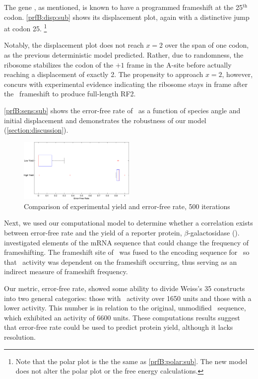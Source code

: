\documentclass[12pt]{article}
\begin{document}
The gene \prfB, as mentioned, is known
to have a programmed frameshift at the 25$^{\textrm{th}}$ codon.
\autoref{prfB:disp:sub} shows its displacement plot,
again with a distinctive jump at codon 25.
\footnote{Note that the polar plot is the the same as \autoref{prfB:polar:sub}.
The new model does not alter the polar plot or the free energy calculations.}

Notably, the displacement plot does not reach $x=2$ over the span of
one codon, as the previous deterministic model predicted.  Rather, due to randomness, the
ribosome stabilizes the codon of the $+1$ frame in the A-site before actually reaching
a displacement of exactly 2.  The propensity to approach $x=2$,
however, concurs with experimental evidence indicating the ribosome
stays in frame after the \prfB\ frameshift to produce full-length RF2.
  
\autoref{prfB:sens:sub} shows the error-free rate of \prfB\ as a function
of species angle and initial displacement and demonstrates the
robustness of our model (\autoref{section:discussion}).

\begin{figure}
  \caption{Comparison of experimental yield and error-free rate, 500 iterations}
  \label{weissboxplot}
  \includegraphics[width=0.5\textwidth]{histograms/weissbox}
\end{figure}

Next, we used our computational model to determine whether a correlation exists between 
error-free rate and the yield of a reporter protein, $\beta$-galactosidase (\bgals).  
\citet{weiss87} investigated elements of the mRNA sequence that could change the frequency 
of frameshifting.  The frameshift site of \prfB\ was fused to the encoding sequence for 
\bgals\ so that \bgals\ activity was dependent on the frameshift occurring, 
thus serving as an indirect measure of frameshift frequency.  

Our metric, error-free rate, showed some ability to divide Weiss's 35 constructs into 
two general categories: those with \bgals\ activity over 1650 units and those with a 
lower activity.  This number is in relation to the original, unmodified \prfB\ sequence, 
which exhibited an activity of 6600 units.  These computations results suggest that 
error-free rate could be used to predict protein yield, although it lacks resolution.
\end{document}
